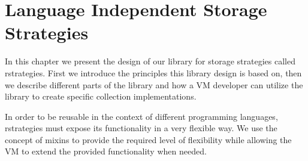 \section{Language Independent Storage Strategies}








In this chapter we present the design of our library for storage strategies called rstrategies.
First we introduce the principles this library design is based on, then we describe different parts of the library and how a VM developer can utilize the library to create specific collection implementations.

In order to be reusable in the context of different programming languages, rstrategies must expose its functionality in a very flexible way.
We use the concept of mixins \cite{brachaMixins, mixins} to provide the required level of flexibility while allowing the VM to extend the provided functionality when needed.


